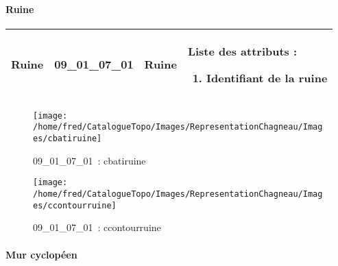 \documentclass[12pt,titlepage]{book}
\begin{document}
\paragraph{Ruine}
\noindent
\vspace{\baselineskip}

\renewcommand{\arraystretch}{1.2}
\begin{supertabular}{|p{10cm}|c|p{13cm}|p{12cm}|}
 Ruine & 09\_01\_07\_01 & Ruine & Liste des attributs :
\begin{enumerate}
  \item Identifiant de la ruine\end{enumerate}
\\
\hline
\end{supertabular}
\begin{figure}[h!]
  \hfill         %
  \begin{minipage}[t]{3cm}
    \begin{center}
      \texttt{[image: /home/fred/CatalogueTopo/Images/RepresentationChagneau/Images/cbatiruine]}
      \caption[~09\_01\_07\_01]{\small{09\_01\_07\_01~:} \tiny{cbatiruine}}\label{cbatiruine}
    \end{center}
  \end{minipage}
  \begin{minipage}[t]{3cm}
    \begin{center}
      \texttt{[image: /home/fred/CatalogueTopo/Images/RepresentationChagneau/Images/ccontourruine]}
      \caption[~09\_01\_07\_01]{\small{09\_01\_07\_01~:} \tiny{ccontourruine}}\label{ccontourruine}
    \end{center}
  \end{minipage}
\end{figure}


\paragraph{Mur cyclopéen}
\noindent
\vspace{\baselineskip}
\end{document}
